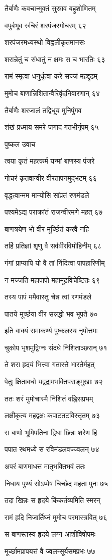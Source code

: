 तैर्बाणैः कवचान्मुक्तं सुस्राव बहुशोणितम्

वपुर्बभूव रुचिरं शरपंजरगोचरम् ६२

शरपंजरमध्यस्थो विह्वलीकृतमानसः

शरान्नेतुं च संधातुं न क्षमः स च भारतिः ६३

रामं स्मृत्वा धनुर्धृत्वा करे सज्जं महद्दृढम्

मुमोच बाणान्निशितान्वैरिवृंदनिवारणान् ६४

तैर्बाणैः शरजालं तद्विधूय मुनिपुंगव

शंखं प्रध्माय समरे जगाद गतभीर्नृपम् ६५

पुष्कल उवाच

त्वया कृतं महत्कर्म यन्मां बाणस्य पंजरे

गोचरं कृतवान्वीर वीरतापनमुद्भटम् ६६

वृद्धत्वान्मम मान्योसि सांप्रतं रणमंडले

पश्यमेऽद्य पराक्रांतं राजन्वीरमणे महत् ६७

बाणत्रयेण भो वीर मूर्च्छितं करवै नहि

तर्हि प्रतिज्ञां शृणु वै सर्ववीरविमोहिनीम् ६८

गंगां प्राप्यापि यो वै तां निंदित्वा पापहारिणीम्

न मज्जति महापापो महामूढविचेष्टितः ६९

तस्य पापं ममैवास्तु चेन्न त्वां रणमंडले

पातये मूर्च्छया वीर सन्नद्धो भव भूपते ७०

इति वाक्यं समाकर्ण्य पुष्कलस्य नृपोत्तमः

चुकोप भृशमुद्विग्नः संदधे निशिताञ्छरान् ७१

ते शरा हृदयं भित्त्वा गतास्ते भारतेर्महत्

पेतुः क्षितावधो यद्वद्रामभक्तिपराङ्मुखाः ७२

ततः शरं मुमोचास्मै निशितं वह्निसप्रभम्

लक्षीकृत्य महद्वक्षः कपाटतटविस्तृतम् ७३

स बाणो भूमिपतिना द्विधा छिन्नः शरेण हि

पपात रथमध्ये स रविमंडलवज्ज्वलन् ७४

अपरं बाणमाधत्त मातृभक्तिभवं ततः

निधाय पुण्यं सोऽप्येष चिच्छेद महता पुनः ७५

तदा खिन्नः स हृदये किंकर्तव्यमिति स्मरन्

रामं हृदि निजार्तिघ्नं मुमोच परमास्त्रवित् ७६

स बाणस्तस्य हृदये लग्न आशीविषोपमः

मूर्च्छामप्रापयत्तं वै ज्वलन्सूर्यसमप्रभः ७७

